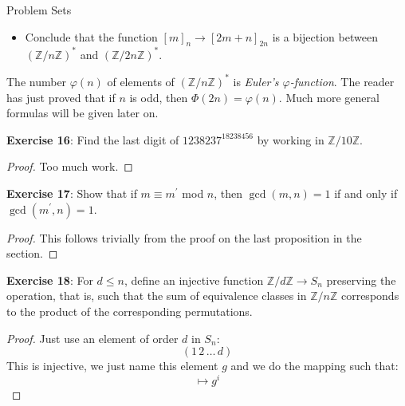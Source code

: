 \documentclass{report}
\begin{document}
\begin{exercises}{Problem Sets}
\begin{itemize}
            \item Conclude that the function $[m]_{n} \rightarrow [2m + n]_{2n}$ is a bijection between $(\mathbb{Z} / n \mathbb{Z})^{*}$ and $(\mathbb{Z} / 2n\mathbb{Z})^{*}$.
        \end{itemize}
        The number $\varphi(n)$ of elements of $(\mathbb{Z}/ n\mathbb{Z})^{*}$ is \textit{Euler's $\varphi$-function}. The reader has just proved that if $n$ is odd, then $\varPhi(2n) = \varphi(n)$. Much more general formulas will be given later on.

    \textbf{Exercise 16}: Find the last digit of $1238237^{18238456}$ by working in $\mathbb{Z} / 10\mathbb{Z}$.
        \begin{proof}
            Too much work.
        \end{proof}

    \textbf{Exercise 17}: Show that if $m \equiv m^{\prime}$ mod $n$, then $\gcd(m, n) = 1$ if and only if $\gcd(m^{\prime}, n) = 1$.
        \begin{proof}
            This follows trivially from the proof on the last proposition in the section.
        \end{proof}

    \textbf{Exercise 18}: For $d \leq n$, define an injective function $\mathbb{Z}/d\mathbb{Z} \rightarrow S_{n}$ preserving the operation, that is, such that the sum of equivalence classes in $\mathbb{Z}/n\mathbb{Z}$ corresponds to the product of the corresponding permutations.
        \begin{proof}
            Just use an element of order $d$ in $S_{n}$:
                \begin{equation*}
                    (1 \, 2 \, \ldots \, d)
                \end{equation*}
            This is injective, we just name this element $g$ and we do the mapping such that:
                \begin{equation*}
                    [i] \mapsto g^{i}
                \end{equation*}
        \end{proof}


\end{exercises}
\end{document}

